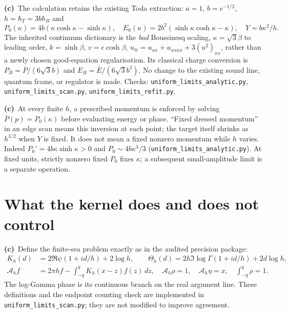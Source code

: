 \documentclass[11pt,a4paper]{article}
\newcommand{\C}{\textbf{(c)}\ }
\newcommand{\scr}[1]{\texttt{uniform\_\allowbreak limits\_\allowbreak #1.py}}
\begin{document}
\C The calculation retains the existing Toda extraction: $a=1$,
$b=e^{-1/2}$, $h=\hbar_T=3b\hbar_B$ and
\begin{equation}
 P_0(\kappa)=4b(\kappa\cosh\kappa-\sinh\kappa),\quad
 E_0(\kappa)=2b^2(\sinh\kappa\cosh\kappa-\kappa),\quad
 Y=b\kappa^2/h.
 \label{eq:scales}
\end{equation}
The inherited continuum dictionary is the \emph{bad} Boussinesq scaling,
$\kappa=\sqrt3\beta$ to leading order, $k=\sinh\beta$, $v=\epsilon\cosh\beta$,
$u_{tt}=u_{xx}+u_{xxxx}+3(u^2)_{xx}$, rather than a newly chosen good-equation
regularisation. Its classical charge conversion is
$P_B=\overline P/(6\sqrt3 b)$ and $E_B=\overline E/(6\sqrt3 b^2)$.
No change to the existing sound line, quantum frame, or regulator is made.
Checks: \scr{analytic}, \scr{scan}, \scr{refit}.

\C At every finite $h$, a prescribed momentum is enforced by solving
$\overline P(p)=P_0(\kappa)$ before evaluating energy or phase.
``Fixed dressed momentum'' in an edge scan means this inversion at each
point; the target itself shrinks as $h^{3/2}$ when $Y$ is fixed.
It does not mean a fixed nonzero momentum while $h$ varies.
Indeed $P_0'=4b\kappa\sinh\kappa>0$ and
$P_0\sim4b\kappa^3/3$ (\scr{analytic}). At fixed units, strictly nonzero fixed
$P_0$ fixes $\kappa$; a subsequent small-amplitude limit is a separate operation.

\section{What the kernel does and does not control}
\C Define the finite-sea problem exactly as in the audited precision package:
\begin{align}
 K_h(d)&=2\Re\psi(1+id/h)+2\log h,\qquad
 \Theta_h(d)=2h\Im\log\Gamma(1+id/h)+2d\log h,\\
 \mathcal A_h f&=2\pi h f-\int_{-q}^qK_h(x-z)f(z)\,dz,
 \quad \mathcal A_h\rho=1,\quad \mathcal A_h\eta=x,
 \quad\int_{-q}^q\rho=1.\label{eq:sea}
\end{align}
The log-Gamma phase is its continuous branch on the real argument line.
These definitions and the endpoint counting check are implemented in
\scr{scan}; they are not modified to improve agreement.
\end{document}
